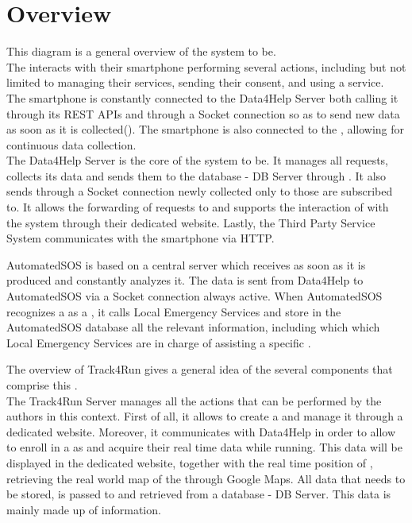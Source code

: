 \documentclass[../../DD.tex]{subfiles}
\begin{document}
\section{Overview}

	This diagram is a general overview of the system to be.\\
	The  interacts with their smartphone performing several actions, including but not limited to managing their services, sending their consent, and using a service. The smartphone is constantly connected to the Data4Help Server both calling it through its REST APIs and through a Socket connection so as to send new data as soon as it is collected(). The smartphone is also connected to the , allowing for continuous data collection.\\
	The Data4Help Server is the core of the system to be. It manages all  requests, collects its data and sends them to the database - DB Server through . It also sends through a Socket connection newly collected  only to those  are subscribed to. It allows the forwarding of  requests to  and supports the interaction of  with the system through their dedicated website.
	Lastly, the Third Party Service System communicates with the  smartphone via HTTP. 



	AutomatedSOS is based on a central server which receives  as soon as it is produced and constantly analyzes it. The data is sent from Data4Help to AutomatedSOS via a Socket connection always active. When AutomatedSOS recognizes a  as a , it calls Local Emergency Services and store in the AutomatedSOS database all the relevant information, including which which Local Emergency Services are in charge of assisting a specific .



	The overview of Track4Run gives a general idea of the several components that comprise this .\\
	The Track4Run Server manages all the actions that can be performed by the authors in this context. First of all, it allows  to create a  and manage it through a dedicated website. Moreover, it communicates with Data4Help in order to allow  to enroll in a  as  and acquire their real time data while running. This data will be displayed in the dedicated  website, together with the real time position of , retrieving the real world map of the  through Google Maps. All data that needs to be stored, is passed to and retrieved from a database - DB Server. This data is mainly made up of  information.

	

	
\end{document}
